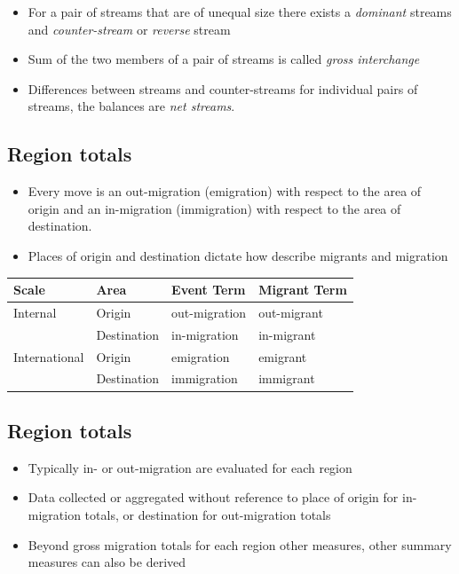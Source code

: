 \documentclass[
]{book}
\providecommand{\tightlist}{%
  \setlength{\itemsep}{0pt}\setlength{\parskip}{0pt}}
\begin{document}
\begin{itemize}
\tightlist
\item
  For a pair of streams that are of unequal size there exists a \emph{dominant} streams and \emph{counter-stream} or \emph{reverse} stream
\item
  Sum of the two members of a pair of streams is called \emph{gross interchange}
\item
  Differences between streams and counter-streams for individual pairs of streams, the balances are \emph{net streams}.
\end{itemize}

\hypertarget{region-totals}{%
\subsection{Region totals}\label{region-totals}}

\begin{itemize}
\item
  Every move is an out-migration (emigration) with respect to the area of origin and an in-migration (immigration) with respect to the area of destination.
\item
  Places of origin and destination dictate how describe migrants and migration
\end{itemize}

\begin{longtable}[]{@{}llll@{}}
\toprule
Scale & Area & Event Term & Migrant Term \\
\midrule
\endhead
Internal & Origin & out-migration & out-migrant \\
& Destination & in-migration & in-migrant \\
International & Origin & emigration & emigrant \\
& Destination & immigration & immigrant \\
\bottomrule
\end{longtable}

\hypertarget{region-totals-1}{%
\subsection{Region totals}\label{region-totals-1}}

\begin{itemize}
\tightlist
\item
  Typically in- or out-migration are evaluated for each region
\item
  Data collected or aggregated without reference to place of origin for in-migration totals, or destination for out-migration totals
\item
  Beyond gross migration totals for each region other measures, other summary measures can also be derived
\end{itemize}
\end{document}
